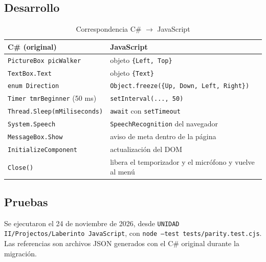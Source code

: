 \documentclass[12pt,a4paper]{article}
\begin{document}
\subsection{Desarrollo}
\begin{table}[H]
\centering
\caption{Correspondencia C\# $\rightarrow$ JavaScript}
\small
\begin{tabular}{ll}
\toprule
\textbf{C\# (original)} & \textbf{JavaScript}\\
\midrule
\texttt{PictureBox picWalker} & objeto \texttt{\{Left, Top\}}\\
\texttt{TextBox.Text} & objeto \texttt{\{Text\}}\\
\texttt{enum Direction} & \texttt{Object.freeze(\{Up, Down, Left, Right\})}\\
\texttt{Timer tmrBeginner} (50 ms) & \texttt{setInterval(..., 50)}\\
\texttt{Thread.Sleep(mMiliseconds)} & \texttt{await} con \texttt{setTimeout}\\
\texttt{System.Speech} & \texttt{SpeechRecognition} del navegador\\
\texttt{MessageBox.Show} & aviso de meta dentro de la página\\
\texttt{InitializeComponent} & actualización del DOM\\
\texttt{Close()} & libera el temporizador y el micrófono y vuelve al menú\\
\bottomrule
\end{tabular}
\end{table}

\subsection{Pruebas}
Se ejecutaron el 24 de noviembre de 2026, desde
\texttt{UNIDAD II/Projectos/Laberinto JavaScript}, con
\texttt{node --test tests/parity.test.cjs}. Las referencias son archivos JSON
generados con el C\# original durante la migración.
\end{document}
